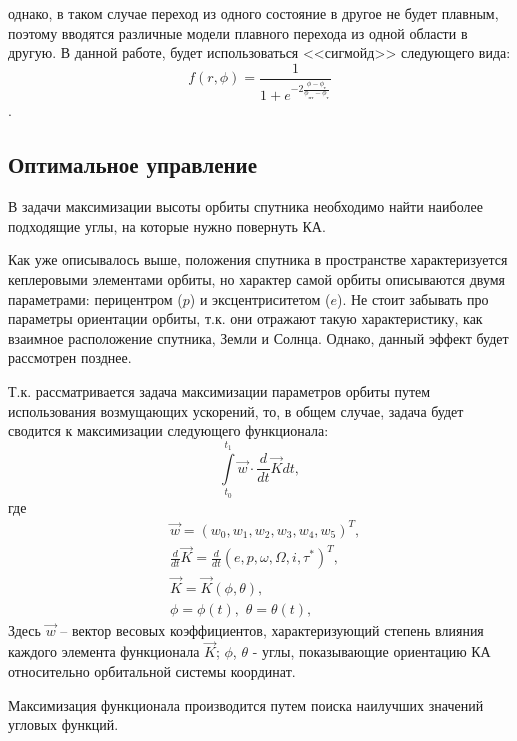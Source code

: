однако, в таком случае переход из одного состояние в другое не будет плавным, поэтому
вводятся различные модели плавного перехода из одной области в другую. В данной работе,
будет использоваться <<сигмойд>> следующего вида:
\begin{equation}
  f(r, \phi) = \frac{1}{1 + e^{-2\frac{\phi - \phi_{\text{т}}}{\phi_{\text{пт}} - \phi_{\text{т}}}}}
\end{equation}.
\subsection{Оптимальное управление}
\noindent\indent В задачи максимизации высоты орбиты спутника необходимо найти
наиболее подходящие углы, на которые нужно повернуть КА.\par
  Как уже описывалось выше, положения спутника в пространстве характеризуется
кеплеровыми элементами орбиты, но характер самой орбиты описываются двумя параметрами:
перицентром ($p$) и эксцентриситетом ($e$). Не стоит забывать про параметры ориентации
орбиты, т.к. они отражают такую характеристику, как взаимное расположение спутника,
Земли и Солнца. Однако, данный эффект будет рассмотрен позднее.\par
  Т.к. рассматривается задача максимизации параметров орбиты путем использования
возмущающих ускорений, то, в общем случае, задача будет сводится к максимизации
следующего функционала:
\begin{equation} \label{eq:IntMaxFullEq}
  \int\limits_{t_0}^{t_1} \vec{w} \cdot \frac{d}{dt}\vec{K} dt,
\end{equation}
где
\begin{equation}
  \begin{aligned}
    & \vec{w} = (w_0, w_1, w_2, w_3, w_4, w_5)^T, \\
    & \frac{d}{dt}\vec{K} = \frac{d}{dt}(e, p, \omega, \Omega, i, \tau^*)^T, \\
    & \vec{K} = \vec{K}(\phi, \theta), \\
    & \phi = \phi(t),\,\, \theta = \theta(t),
  \end{aligned}
\end{equation}
Здесь $\vec{w}$ -- вектор весовых коэффициентов, характеризующий степень влияния
каждого элемента функционала $\vec{K}$; $\phi$, $\theta$ - углы, показывающие ориентацию
КА относительно орбитальной системы координат.\par
  Максимизация функционала производится путем поиска наилучших значений угловых
функций.
